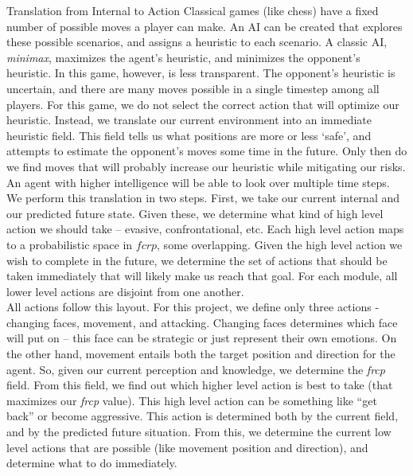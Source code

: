 \documentclass[11pt]{article}
\begin{document}
\begin{section}{Translation from Internal to Action}
Classical games (like chess) have a fixed number of possible moves a player can make. An AI can be created that explores these possible scenarios, and assigns a heuristic to each scenario. A classic AI, \emph{minimax}, maximizes the agent's heuristic, and minimizes the opponent's heuristic. In this game, however, is less transparent. The opponent's heuristic is uncertain, and there are many moves possible in a single timestep among all players. For this game, we do not select the correct action that will optimize our heuristic. Instead, we translate our current environment into an immediate heuristic field. This field tells us what positions are more or less `safe', and attempts to estimate the opponent's moves some time in the future. Only then do we find moves that will probably increase our heuristic while mitigating our risks. An agent with higher intelligence will be able to look over multiple time steps.\\

We perform this translation in two steps. First, we take our current internal and our predicted future state. Given these, we determine what kind of high level action we should take -- evasive, confrontational, etc. Each high level action maps to a probabilistic space in $fcrp$, some overlapping.  Given the high level action we wish to complete in the future, we determine the set of actions that should be taken immediately that will likely make us reach that goal. For each module, all lower level actions are disjoint from one another. \\

All actions follow this layout. For this project, we define only three actions - changing faces, movement, and attacking. Changing faces determines which face will put on -- this face can be strategic or just represent their own emotions. On the other hand, movement entails both the target position and direction for the agent. So, given our current perception and knowledge, we determine the \emph{frcp} field. From this field, we find out which higher level action is best to take (that maximizes our \emph{frcp} value). This high level action can be something like ``get back'' or become aggressive. This action is determined both by the current field, and by the predicted future situation. From this, we determine the current low level actions that are possible (like movement position and direction), and determine what to do immediately.\\


\end{section}
\end{document}
